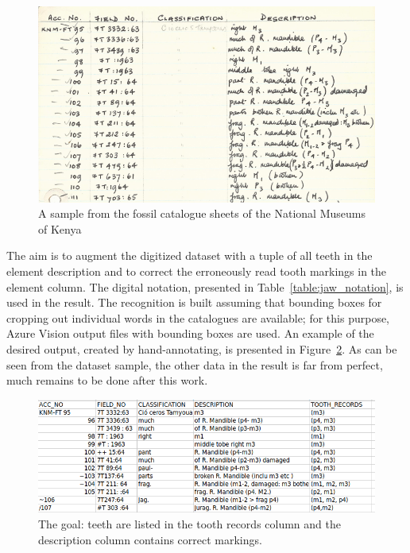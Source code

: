 \documentclass[english,twoside,openright]{UH_DS_MSc}
\begin{document}
\begin{figure}[ht]
    \centering
    \includegraphics*[scale=0.5]{images/cataloguesample3.png}
    \caption{A sample from the fossil catalogue sheets of the National Museums of Kenya}
    \label{image:cataloguesample}
\end{figure}

The aim is to augment the digitized dataset with a tuple of all teeth in the 
element description and to correct the erroneously read tooth markings in the element column.
The digital notation, presented in Table~\ref{table:jaw_notation}, is used in the result.
The recognition is built assuming that bounding boxes for cropping out individual words in the 
catalogues are available; for this purpose, Azure Vision output files with bounding boxes
are used. An example of the desired output,
created by hand-annotating, is presented in Figure~\ref{image:goal}. 
As can be seen from the dataset sample, the other data in the result is far from perfect, much remains to be done after this work.

\begin{figure}[ht]
    \centering
    \includegraphics*[scale=0.5]{images/goal.png}
    \caption{The goal: teeth are listed in the tooth records column and the description column contains correct markings.}
    \label{image:goal}
\end{figure}
\end{document}
